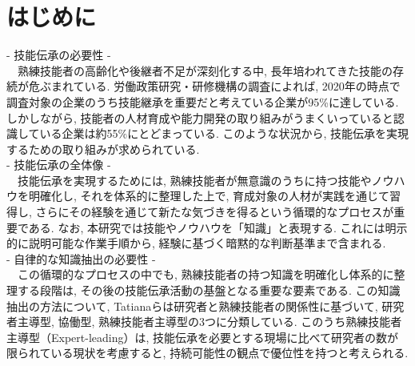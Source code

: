 \chapter{はじめに}
- 技能伝承の必要性 -\\
　熟練技能者の高齢化や後継者不足が深刻化する中, 長年培われてきた技能の存続が危ぶまれている. 労働政策研究・研修機構の調査によれば, 2020年の時点で調査対象の企業のうち技能継承を重要だと考えている企業が95\%に達している. しかしながら, 技能者の人材育成や能力開発の取り組みがうまくいっていると認識している企業は約55\%にとどまっている\cite{JILPT2020}. このような状況から, 技能伝承を実現するための取り組みが求められている.\\

- 技能伝承の全体像 -\\
　技能伝承を実現するためには, 熟練技能者が無意識のうちに持つ技能やノウハウを明確化し, それを体系的に整理した上で, 育成対象の人材が実践を通じて習得し, さらにその経験を通じて新たな気づきを得るという循環的なプロセスが重要である. なお, 本研究では技能やノウハウを「知識」と表現する. これには明示的に説明可能な作業手順から, 経験に基づく暗黙的な判断基準まで含まれる.\\

- 自律的な知識抽出の必要性 -\\
　この循環的なプロセスの中でも, 熟練技能者の持つ知識を明確化し体系的に整理する段階は, その後の技能伝承活動の基盤となる重要な要素である. この知識抽出の方法について, Tatianaらは研究者と熟練技能者の関係性に基づいて, 研究者主導型, 協働型, 熟練技能者主導型の3つに分類している\cite{Tatiana2012}. このうち熟練技能者主導型（Expert-leading）は, 技能伝承を必要とする現場に比べて研究者の数が限られている現状を考慮すると, 持続可能性の観点で優位性を持つと考えられる.\\


